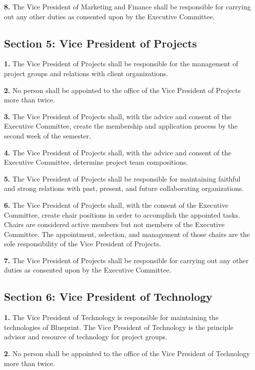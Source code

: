 \documentclass{article}
\begin{document}
\textbf{8.} The Vice President of Marketing and Finance shall be responsible for carrying out any other duties as consented upon by the Executive Committee.

\subsection{Section 5: Vice President of Projects}

\textbf{1.} The Vice President of Projects shall be responsible for the management of project groups and relations with client organizations.

\textbf{2.} No person shall be appointed to the office of the Vice President of Projects more than twice.

\textbf{3.} The Vice President of Projects shall, with the advice and consent of the Executive Committee, create the membership and application process by the second week of the semester.

\textbf{4.} The Vice President of Projects shall, with the advice and consent of the Executive Committee, determine project team compositions.

\textbf{5.} The Vice President of Projects shall be responsible for maintaining faithful and strong relations with past, present, and future collaborating organizations.

\textbf{6.} The Vice President of Projects shall, with the consent of the Executive Committee, create chair positions in order to accomplish the appointed tasks. Chairs are considered active members but not members of the Executive Committee. The appointment, selection, and management of those chairs are the sole responsibility of the Vice President of Projects.

\textbf{7.} The Vice President of Projects shall be responsible for carrying out any other duties as consented upon by the Executive Committee.

\subsection{Section 6: Vice President of Technology}

\textbf{1.} The Vice President of Technology is responsible for maintaining the technologies of Blueprint. The Vice President of Technology is the principle advisor and resource of technology for project groups.

\textbf{2.} No person shall be appointed to the office of the Vice President of Technology more than twice.
\end{document}
